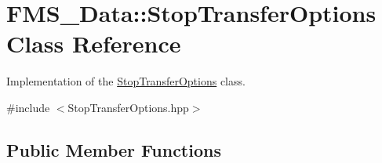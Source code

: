 \hypertarget{classFMS__Data_1_1StopTransferOptions}{
\section{FMS\_\-Data::StopTransferOptions Class Reference}
\label{classFMS__Data_1_1StopTransferOptions}
}


Implementation of the \hyperlink{classFMS__Data_1_1StopTransferOptions}{StopTransferOptions} class.  




{\ttfamily \#include $<$StopTransferOptions.hpp$>$}

\subsection*{Public Member Functions}
